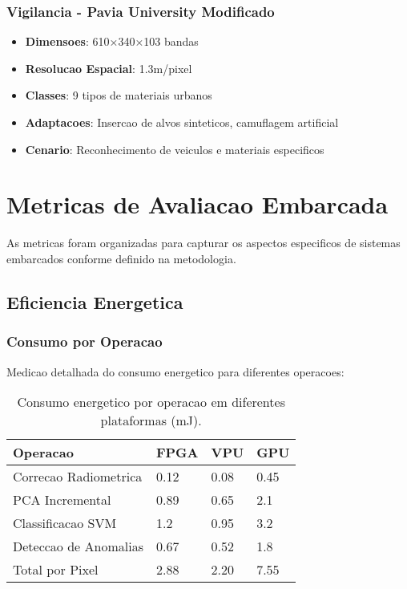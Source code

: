 \subsubsection{Vigilancia - Pavia University Modificado}
\begin{itemize}
    \item \textbf{Dimensoes}: 610×340×103 bandas
    \item \textbf{Resolucao Espacial}: 1.3m/pixel
    \item \textbf{Classes}: 9 tipos de materiais urbanos
    \item \textbf{Adaptacoes}: Insercao de alvos sinteticos, camuflagem artificial
    \item \textbf{Cenario}: Reconhecimento de veiculos e materiais especificos
\end{itemize}

\section{Metricas de Avaliacao Embarcada}\label{sec:metricas_avaliacao}

As metricas foram organizadas para capturar os aspectos especificos de sistemas embarcados conforme definido na metodologia.

\subsection{Eficiencia Energetica}

\subsubsection{Consumo por Operacao}
Medicao detalhada do consumo energetico para diferentes operacoes:

\begin{table}[!htp]
\caption[Consumo Energetico por Operacao]{Consumo energetico por operacao em diferentes plataformas (mJ).}
\label{tab:consumo_operacao}
\begin{center}
\begin{tabular}{|p{3cm}|p{2cm}|p{2cm}|p{2cm}|}
\hline
\textbf{Operacao} & \textbf{FPGA} & \textbf{VPU} & \textbf{GPU} \\
\hline
Correcao Radiometrica & 0.12 & 0.08 & 0.45 \\
\hline
PCA Incremental & 0.89 & 0.65 & 2.1 \\
\hline
Classificacao SVM & 1.2 & 0.95 & 3.2 \\
\hline
Deteccao de Anomalias & 0.67 & 0.52 & 1.8 \\
\hline
Total por Pixel & 2.88 & 2.20 & 7.55 \\
\hline
\end{tabular}
\end{center}
\end{table}

